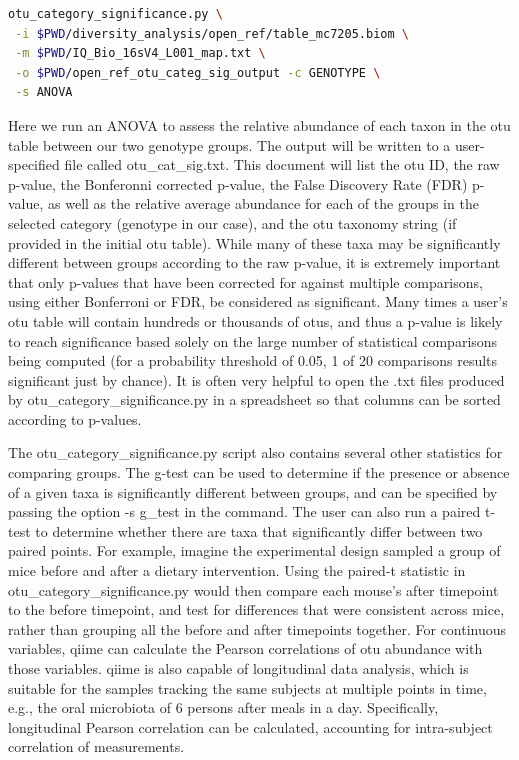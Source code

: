 \begin{lstlisting}[language=bash]
otu_category_significance.py \
 -i $PWD/diversity_analysis/open_ref/table_mc7205.biom \
 -m $PWD/IQ_Bio_16sV4_L001_map.txt \
 -o $PWD/open_ref_otu_categ_sig_output -c GENOTYPE \
 -s ANOVA
\end{lstlisting}

Here we run an ANOVA to assess the relative abundance of each taxon in the \gls{otu} table between our
two genotype groups. The output will be written to a user-specified file called otu\_cat\_sig.txt.
This document will list the \gls{otu} ID, the raw p-value, the Bonferonni corrected p-value, the False
Discovery Rate (FDR) p-value, as well as the relative average abundance for each of the groups in
the selected category (genotype in our case), and the \gls{otu} taxonomy string (if provided in the initial
\gls{otu} table). While many of these taxa may be significantly different between groups according to the
raw p-value, it is extremely important that only p-values that have been corrected for against multiple
comparisons, using either Bonferroni or FDR, be considered as significant. Many times a user's \gls{otu}
table will contain hundreds or thousands of \gls{otu}s, and thus a p-value is likely to reach significance
based solely on the large number of statistical comparisons being computed (for a probability threshold
of 0.05, 1 of 20 comparisons results significant just by chance). It is often very helpful to open the
.txt files produced by otu\_category\_significance.py in a spreadsheet so that columns can be sorted
according to p-values.

The otu\_category\_significance.py script also contains several other statistics for comparing groups.
The g-test can be used to determine if the presence or absence of a given taxa is significantly different
between groups, and can be specified by passing the option -s g\_test in the command. The user can also
run a paired t-test to determine whether there are taxa that significantly differ between two paired points.
For example, imagine the experimental design sampled a group of mice before and after a dietary intervention.
Using the paired-t statistic in otu\_category\_significance.py would then compare each mouse's after timepoint
to the before timepoint, and test for differences that were consistent across mice, rather than grouping all
the before and after timepoints together. For continuous variables, \gls{qiime} can calculate the Pearson correlations
of \gls{otu} abundance with those variables. \gls{qiime} is also capable of longitudinal data analysis, which is suitable
for the samples tracking the same subjects at multiple points in time, e.g., the oral microbiota of 6 persons
after meals in a day. Specifically, longitudinal Pearson correlation can be calculated, accounting for intra-subject
correlation of measurements.


